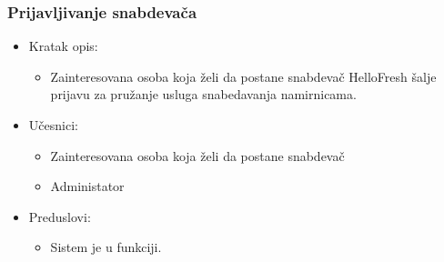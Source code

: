 \subsubsection{Prijavljivanje snabdevača}

\begin{itemize}
	\item Kratak opis:
		\begin{itemize}
			\item Zainteresovana osoba koja želi da postane snabdevač HelloFresh šalje prijavu za pružanje usluga snabedavanja namirnicama.
		\end{itemize}
	\item Učesnici:
		\begin{itemize}
			\item Zainteresovana osoba koja želi da postane snabdevač
			\item Administator
		\end{itemize}	
	\item Preduslovi:
		\begin{itemize}
	       \item Sistem je u funkciji.
		\end{itemize}	


\end{itemize}
